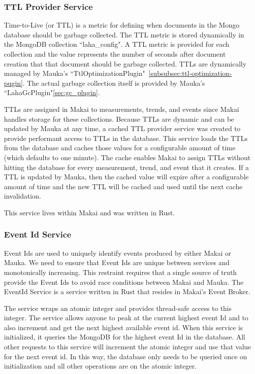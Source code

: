 \subsubsection{TTL Provider Service}
Time-to-Live (or TTL) is a metric for defining when documents in the Mongo database should be garbage collected. The TTL metric is stored dynamically in the MongoDB collection ``laha\_config". A TTL metric is provided for each collection and the value represents the number of seconds after document creation that that document should be garbage collected. TTLs are dynamically managed by Mauka's ``TtlOptimizationPlugin"~\ref{subsubsec:ttl-optimization-pugin}. The actual garbage collection itself is provided by Mauka's ``LahaGcPlugin"\ref{sec:gc_plugin}.

TTLs are assigned in Makai to measurements, trends, and events since Makai handles storage for these collections. Because TTLs are dynamic and can be updated by Mauka at any time, a cached TTL provider service was created to provide performant access to TTLs in the database. This service loads the TTLs from the database and caches those values for a configurable amount of time (which defaults to one minute). The cache enables Makai to assign TTLs without hitting the database for every measurement, trend, and event that it creates. If a TTL is updated by Mauka, then the cached value will expire after a configurable amount of time and the new TTL will be cached and used until the next cache invalidation.

This service lives within Makai and was written in Rust.

\subsubsection{Event Id Service}
Event Ids are used to uniquely identify events produced by either Makai or Mauka. We need to ensure that Event Ids are unique between services and monotonically increasing. This restraint requires that a single source of truth provide the Event Ids to avoid race conditions between Makai and Mauka. The EventId Service is a service written in Rust that resides in Makai's Event Broker.

The service wraps an atomic integer and provides thread-safe access to this integer. The service allows anyone to peak at the current highest event Id and to also increment and get the next highest available event id. When this service is initialized, it queries the MongoDB for the highest event Id in the database. All other requests to this service will increment the atomic integer and use that value for the next event id. In this way, the database only needs to be queried once on initialization and all other operations are on the atomic integer.

